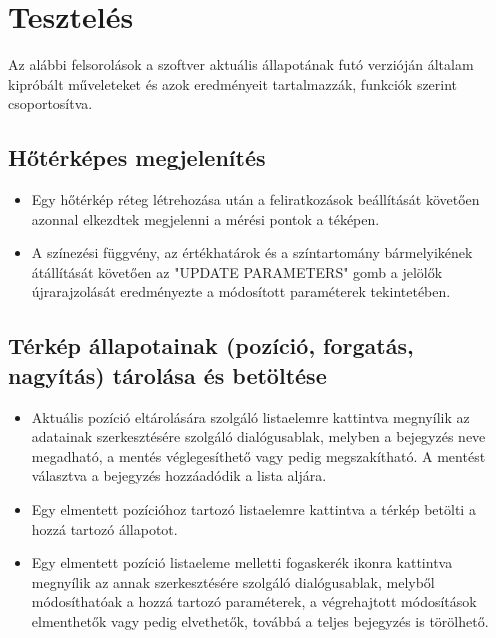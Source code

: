 \section{Tesztelés}

Az alábbi felsorolások a szoftver aktuális állapotának futó verzióján általam
kipróbált műveleteket és azok eredményeit tartalmazzák, funkciók szerint
csoportosítva.

\subsection{Hőtérképes megjelenítés}

\begin{itemize}

  \item Egy hőtérkép réteg létrehozása után a feliratkozások beállítását
  követően azonnal elkezdtek megjelenni a mérési pontok a téképen.

  \item A színezési függvény, az értékhatárok és a színtartomány bármelyikének
  átállítását követően az "UPDATE PARAMETERS" gomb a jelölők újrarajzolását
  eredményezte a módosított paraméterek tekintetében.

\end{itemize}


\subsection{Térkép állapotainak (pozíció, forgatás, nagyítás) tárolása és betöltése}

\begin{itemize}

  \item Aktuális pozíció eltárolására szolgáló listaelemre kattintva megnyílik
  az adatainak szerkesztésére szolgáló dialógusablak, melyben a bejegyzés neve
  megadható, a mentés véglegesíthető vagy pedig megszakítható. A mentést
  választva a bejegyzés hozzáadódik a lista aljára.

  \item Egy elmentett pozícióhoz tartozó listaelemre kattintva a térkép betölti
  a hozzá tartozó állapotot.

  \item Egy elmentett pozíció listaeleme melletti fogaskerék ikonra kattintva
  megnyílik az annak szerkesztésére szolgáló dialógusablak, melyből
  módosíthatóak a hozzá tartozó paraméterek, a végrehajtott módosítások
  elmenthetők vagy pedig elvethetők, továbbá a teljes bejegyzés is törölhető.

\end{itemize}


